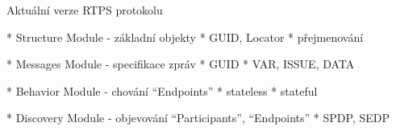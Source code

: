 \sec Aktuální verze RTPS protokolu

* Structure Module - základní objekty
\begitems
* GUID, Locator
* přejmenování
\enditems

* Messages Module - specifikace zpráv
\begitems
* GUID
* VAR, ISSUE, DATA
\enditems

* Behavior Module - chování ``Endpoints''
\begitems
* stateless
* stateful
\enditems

* Discovery Module - objevování ``Participants'', ``Endpoints''
\begitems
* SPDP, SEDP
\enditems

